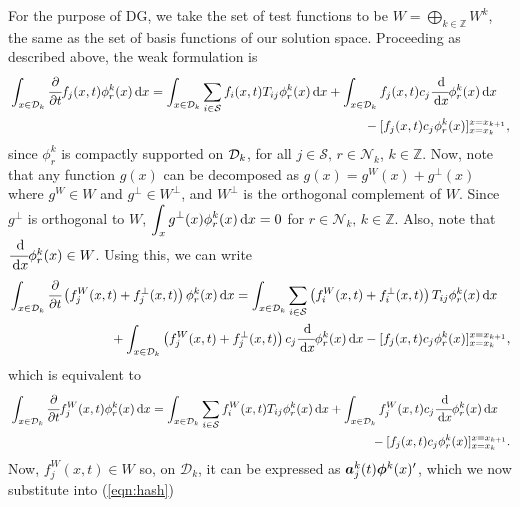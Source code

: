 For the purpose of DG, we take the set of test functions to be \(W = \bigoplus\limits_{k\in\mathbb Z} W^k\), the same as the set of basis functions of our solution space. Proceeding as described above, the weak formulation is 
\begin{align*}
	\begin{multlined}[t]\int_{x\in\calD_k}\cfrac{\partial}{\partial t} f_j(x,t)\phi_r^k(x)\wrt x = \int_{x\in\calD_k}\sum_{i\in\calS} f_i(x,t)T_{ij}\phi_r^k(x)\wrt x  
	+  \int_{x\in\calD_k} f_j(x,t)c_j\cfrac{\wrt}{\wrt x}\phi_r^k(x)\wrt x \\ {}- [f_j(x,t)c_j\phi_r^k(x)]_{x=x_k}^{x=x_{k+1}}, \end{multlined}
\end{align*}
since \(\phi_r^k\) is compactly supported on \(\mathcal{D}_k\), for all \(j\in\mathcal S,\,r\in\mathcal N_k\), \(k\in\mathbb Z.\) Now, note that any function \(g(x)\) can be decomposed as \(g(x) = g^{W}(x)+g^\perp(x)\) where \(g^{W}\in W\) and \(g^\perp \in W^\perp\), and \(W^\perp\) is the orthogonal complement of \(W\). Since \(g^\perp\) is orthogonal to \(W\), \(\displaystyle\int_{x}g^\perp(x)\phi_r^k(x)\, \mathrm{d} x=0\) for \(r\in\mathcal N_k,\,k\in\mathbb Z\). Also, note that \(\cfrac{\, \mathrm{d}}{\, \mathrm{d} x}\phi_r^k(x)\in W\). Using this, we can write 
\begin{align*}
	\begin{multlined}[t]\int_{x\in\calD_k}\cfrac{\partial}{\partial t} \left(f_j^W(x,t)+f_j^\perp(x,t)\right)\phi_r^k(x)\wrt x 
	= \int_{x\in\calD_k}\sum_{i\in\calS} \left(f_i^W(x,t)+f_i^\perp(x,t)\right)T_{ij}\phi_r^k(x)\wrt x  
	\\ {}
	+  \int_{x\in\calD_k} \left(f_j^W(x,t)+f_j^\perp(x,t)\right)c_j\cfrac{\wrt}{\wrt x}\phi_r^k(x)\wrt x - [f_j(x,t)c_j\phi_r^k(x)]_{x=x_k}^{x=x_{k+1}}, \end{multlined}
\end{align*}
	which is equivalent to
\begin{align}
	\begin{multlined}[t]\int_{x\in\calD_k}\cfrac{\partial}{\partial t} f_j^W(x,t)\phi_r^k(x)\wrt x = \int_{x\in\calD_k}\sum_{i\in\calS} f_i^W(x,t)T_{ij}\phi_r^k(x)\wrt x  
	+  \int_{x\in\calD_k} f_j^W(x,t)c_j\cfrac{\wrt}{\wrt x}\phi_r^k(x)\wrt x \\{} - [f_j(x,t)c_j\phi_r^k(x)]_{x=x_k}^{x=x_{k+1}}. \end{multlined} \label{eqn:hash}
\end{align}
Now, \(f_j^W(x,t)\in W\) so, on \(\mathcal D_k\), it can be expressed as \(\boldsymbol a_j^k(t) \boldsymbol \phi^k(x)'{}\), which we now substitute into (\ref{eqn:hash})
